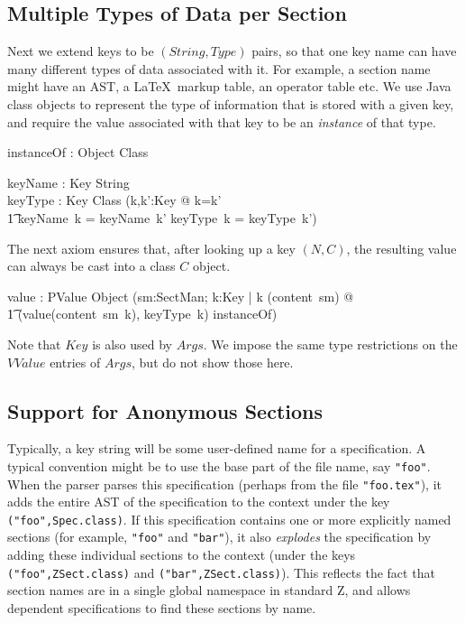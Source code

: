 \documentclass{llncs} %
\begin{document}
\subsection{Multiple Types of Data per Section}

Next we extend keys to be $(String,Type)$ pairs, so that
one key name can have many different types of data associated with it.
For example, a section name might have an AST, a \LaTeX\ markup
table, an operator table etc.  We use Java class objects to
represent the type of information that is stored with a given key, 
and require the value associated with that key to be an \emph{instance}
of that type.

\begin{zed}
\end{zed}

\begin{axdef}
  instanceOf : Object \rel Class
\end{axdef}

\begin{axdef}
  keyName : Key \fun String \\
  keyType : Key \fun Class
\where
  (\forall k,k':Key @ k=k' \\
  \t1   \iff keyName~k = keyName~k' \land keyType~k = keyType~k') \\
\end{axdef}

The next axiom ensures that, after looking up a key $(N,C)$,
the resulting value can always be cast into a class $C$ object.
\begin{axdef}
  value : PValue \fun Object  
\where
  (\forall sm:SectMan; k:Key | k \in \dom(content~sm) @ \\
  \t1 (value(content~sm~k), keyType~k) \in instanceOf)
\end{axdef}

Note that $Key$ is also used by $Args$.
We impose the same type restrictions on the $VValue$ entries
of $Args$, but do not show those here.

\subsection{Support for Anonymous Sections}

Typically, a key string will be some user-defined name for
a specification.  A typical convention might be to use the 
base part of the file name, say \texttt{"foo"}.  
When the parser parses this specification (perhaps from the file
\texttt{"foo.tex"}), it adds the entire AST of the specification
to the context under the key \texttt{("foo",Spec.class)}.
If this specification contains one or more explicitly named sections
(for example, \texttt{"foo"} and \texttt{"bar"}),
it also \emph{explodes} the specification by adding these
individual sections to the context (under the keys
\texttt{("foo",ZSect.class)} and \texttt{("bar",ZSect.class)}).
This reflects the fact that section names are in a single global 
namespace in standard Z, and allows dependent specifications to
find these sections by name.
\end{document}
